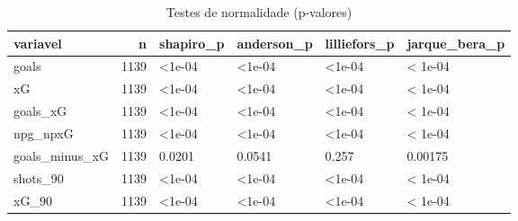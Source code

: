 \begin{table}

\caption{\label{tab:normalidade_g10}Testes de normalidade (p-valores)}
\centering
\begin{tabular}[t]{lrllll}
\toprule
variavel & n & shapiro\_p & anderson\_p & lilliefors\_p & jarque\_bera\_p\\
\midrule
goals & 1139 & <1e-04 & <1e-04 & <1e-04 & < 1e-04\\
xG & 1139 & <1e-04 & <1e-04 & <1e-04 & < 1e-04\\
goals\_xG & 1139 & <1e-04 & <1e-04 & <1e-04 & < 1e-04\\
npg\_npxG & 1139 & <1e-04 & <1e-04 & <1e-04 & < 1e-04\\
goals\_minus\_xG & 1139 & 0.0201 & 0.0541 & 0.257 & 0.00175\\
\addlinespace
shots\_90 & 1139 & <1e-04 & <1e-04 & <1e-04 & < 1e-04\\
xG\_90 & 1139 & <1e-04 & <1e-04 & <1e-04 & < 1e-04\\
\bottomrule
\end{tabular}
\end{table}
